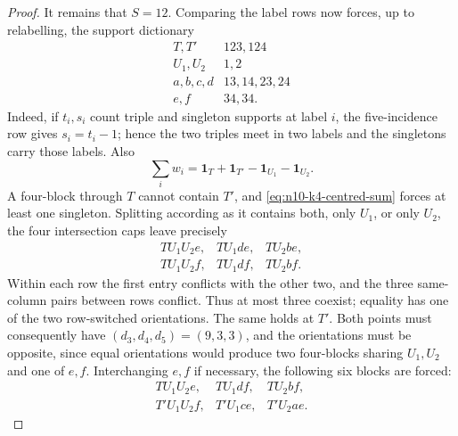 \begin{proof}
It remains that $S=12$.  Comparing the label rows now forces, up to
relabelling, the support dictionary
\begin{equation}\label{eq:n10-k4-S12-supports}
 \begin{array}{c|c}
 T,T'&123,124\\
 U_1,U_2&1,2\\
 a,b,c,d&13,14,23,24\\
 e,f&34,34.
 \end{array}
\end{equation}
Indeed, if $t_i,s_i$ count triple and singleton supports at label $i$, the
five-incidence row gives $s_i=t_i-1$; hence the two triples meet in two
labels and the singletons carry those labels.  Also
\begin{equation}\label{eq:n10-k4-centred-sum}
 \sum_iw_i=\mathbf1_T+\mathbf1_{T'}-
            \mathbf1_{U_1}-\mathbf1_{U_2}.
\end{equation}
A four-block through $T$ cannot contain $T'$, and
\eqref{eq:n10-k4-centred-sum} forces at least one singleton.  Splitting
according as it contains both, only $U_1$, or only $U_2$, the four
intersection caps leave precisely
\begin{equation}\label{eq:n10-k4-local-six}
 \begin{array}{lll}
 TU_1U_2e,&TU_1de,&TU_2be,\\
 TU_1U_2f,&TU_1df,&TU_2bf.
 \end{array}
\end{equation}
Within each row the first entry conflicts with the other two, and the three
same-column pairs between rows conflict.  Thus at most three coexist;
equality has one of the two row-switched orientations.  The same holds at
$T'$.  Both points must consequently have $(d_3,d_4,d_5)=(9,3,3)$, and
the orientations must be opposite, since equal orientations would produce
two four-blocks sharing $U_1,U_2$ and one of $e,f$.  Interchanging $e,f$
if necessary, the following six blocks are forced:
\begin{equation}\label{eq:n10-k4-forced-six}
 \begin{array}{lll}
 TU_1U_2e,&TU_1df,&TU_2bf,\\
 T'U_1U_2f,&T'U_1ce,&T'U_2ae.
 \end{array}
\end{equation}


\end{proof}
